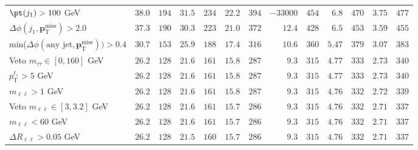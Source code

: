 \begin{table}
\begin{center}
\begin{tabular*}{\textwidth}{@{\extracolsep{\fill}}lrrrrrrrrrrrr}
    $\pt(j_1) > 100$ GeV & $38.0$ & $194$    & $31.5$ & $234$    & $22.2$ & $394$    & $-33000$ & $454$    & $6.8$ & $470$    & $3.75$ & $477$   \\ 
    $\Delta\phi\left(j_1, \mathbf{p}_\text{T}^\text{miss}\right) > 2.0$ & $37.3$ & $190$    & $30.3$ & $223$    & $21.0$ & $372$    & $12.4$ & $428$    & $6.5$ & $453$    & $3.59$ & $455$   \\ 
    min($\Delta\phi\left(\text{any jet}, \mathbf{p}_\text{T}^\text{miss}\right)) > 0.4$ & $30.7$ & $153$    & $25.9$ & $188$    & $17.4$ & $316$    & $10.6$ & $360$    & $5.47$ & $379$    & $3.07$ & $383$   \\ 
    Veto $m_{\tau\tau} \in [0, 160]$ GeV & $26.2$ & $128$    & $21.6$ & $161$    & $15.8$ & $287$    & $9.3$ & $315$    & $4.77$ & $333$    & $2.73$ & $340$   \\ 
    $p_\text{T}^{\ell_1} > 5$ GeV & $26.2$ & $128$    & $21.6$ & $161$    & $15.8$ & $287$    & $9.3$ & $315$    & $4.77$ & $333$    & $2.73$ & $340$   \\ 
    $m_{\ell\ell} > 1$ GeV & $26.2$ & $128$    & $21.6$ & $161$    & $15.8$ & $287$    & $9.3$ & $315$    & $4.76$ & $332$    & $2.72$ & $339$   \\ 
    Veto $m_{\ell\ell} \in [3, 3.2]$ GeV & $26.2$ & $128$    & $21.6$ & $161$    & $15.7$ & $286$    & $9.3$ & $315$    & $4.76$ & $332$    & $2.71$ & $337$   \\ 
    $m_{\ell\ell} < 60$ GeV & $26.2$ & $128$    & $21.6$ & $161$    & $15.7$ & $286$    & $9.3$ & $315$    & $4.76$ & $332$    & $2.71$ & $337$   \\ 
    $\Delta R_{\ell\ell} > 0.05$ GeV & $26.2$ & $128$    & $21.5$ & $160$    & $15.7$ & $286$    & $9.3$ & $315$    & $4.76$ & $332$    & $2.71$ & $337$   \\ 
    

\end{tabular*}
\end{center}
\end{table}
